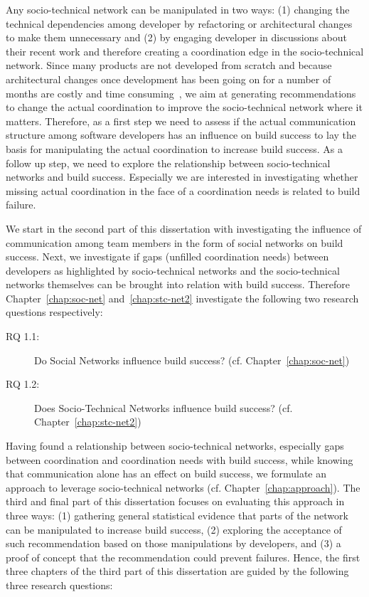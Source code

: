 Any socio-technical network can be manipulated in two ways: (1) changing the technical dependencies among developer by refactoring or architectural changes to make them unnecessary and (2) by engaging developer in discussions about their recent work and therefore creating a coordination edge in the socio-technical network.
Since many products are not developed from scratch and because architectural changes once development has been going on for a number of months are costly and time consuming~\cite{vangurp:jss:2002}, we aim at generating recommendations to change the actual coordination to improve the socio-technical network where it matters.
Therefore, as a first step we need to assess if the actual communication structure among software developers has an influence on build success to lay the basis for manipulating the actual coordination to increase build success.
As a follow up step, we need to explore the relationship between socio-technical networks and build success.
Especially we are interested in investigating whether missing actual coordination in the face of a coordination needs is related to build failure.

We start in the second part of this dissertation with investigating the influence of communication among team members in the form of social networks on build success.
Next, we investigate if gaps (unfilled coordination needs) between developers as highlighted by socio-technical networks and the socio-technical networks themselves can be brought into relation with build success.
Therefore Chapter~\ref{chap:soc-net} and~\ref{chap:stc-net2} investigate the following two research questions respectively:

\begin{description}
  \item[RQ 1.1:] Do Social Networks influence build success? (cf. Chapter~\ref{chap:soc-net})
  \item[RQ 1.2:] Does Socio-Technical Networks influence build success? (cf. Chapter~\ref{chap:stc-net2})
\end{description}

Having found a relationship between socio-technical networks, especially gaps between coordination and coordination needs with build success, while knowing that communication alone has an effect on build success, we formulate an approach to leverage socio-technical networks (cf. Chapter~\ref{chap:approach}).
The third and final part of this dissertation focuses on evaluating this approach in three ways:
(1) gathering general statistical evidence that parts of the network can be manipulated to increase build success,
(2) exploring the acceptance of such recommendation based on those manipulations by developers,
and (3) a proof of concept that the recommendation could prevent failures.
Hence, the first three chapters of the third part of this dissertation are guided by the following three research questions:

